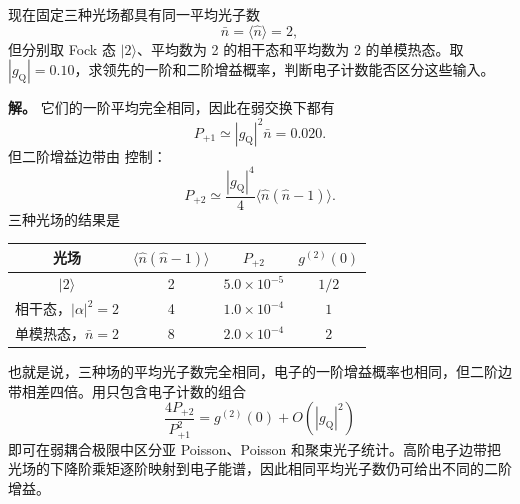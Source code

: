 \begin{exbox}[相同平均光子数的不同电子谱]
现在固定三种光场都具有同一平均光子数
\begin{equation*}
 \bar n=\langle\hat n\rangle=2,
\end{equation*}
但分别取 Fock 态 $|2\rangle$、平均数为 2 的相干态和平均数为 2 的单模热态。取 $|g_{\mathrm Q}|=0.10$，求领先的一阶和二阶增益概率，判断电子计数能否区分这些输入。

\textbf{解。} 它们的一阶平均完全相同，因此在弱交换下都有
\begin{equation*}
 P_{+1}\simeq|g_{\mathrm Q}|^2\bar n=0.020.
\end{equation*}
但二阶增益边带由 控制：
\begin{equation*}
 P_{+2}
 \simeq\frac{|g_{\mathrm Q}|^4}{4}
 \langle\hat n(\hat n-1)\rangle.
\end{equation*}
三种光场的结果是
\begin{center}
\begin{tabular}{c|c|c|c}
 光场 & $\langle\hat n(\hat n-1)\rangle$ & $P_{+2}$ & $g^{(2)}(0)$\\\hline
 $|2\rangle$ & 2 & $5.0\times10^{-5}$ & $1/2$\\
 相干态，$|\alpha|^2=2$ & 4 & $1.0\times10^{-4}$ & $1$\\
 单模热态，$\bar n=2$ & 8 & $2.0\times10^{-4}$ & $2$
\end{tabular}
\end{center}
也就是说，三种场的平均光子数完全相同，电子的一阶增益概率也相同，但二阶边带相差四倍。用只包含电子计数的组合
\begin{equation}
 {
 \frac{4P_{+2}}{P_{+1}^2}
 =g^{(2)}(0)+O(|g_{\mathrm Q}|^2)}
 \label{eq:qpinem-g2-electron-ratio-dp65}
\end{equation}
即可在弱耦合极限中区分亚 Poisson、Poisson 和聚束光子统计。高阶电子边带把光场的下降阶乘矩逐阶映射到电子能谱，因此相同平均光子数仍可给出不同的二阶增益。
\end{exbox}
